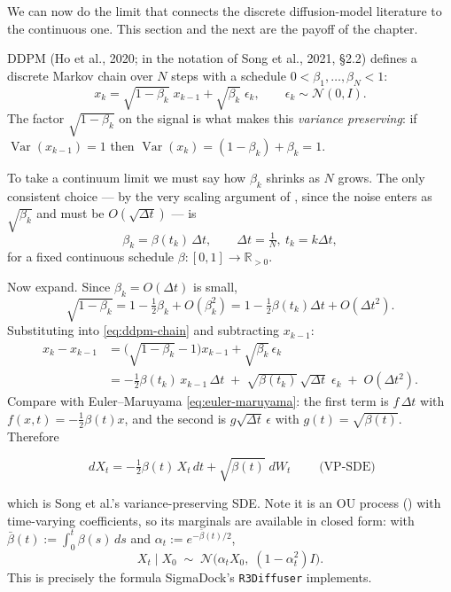 \documentclass[11pt,a4paper]{report}
\theoremstyle{definition}
\theoremstyle{remark}
\DeclareMathOperator{\Var}{Var}
\newcommand{\RR}{\mathbb R}
\newcommand{\pyfunc}[1]{\texttt{#1}}
\begin{document}
We can now do the limit that connects the discrete diffusion-model
literature to the continuous one. This section and the next are the payoff
of the chapter.

DDPM (Ho et al., 2020; in the notation of Song et al., 2021, §2.2) defines a
discrete Markov chain over $N$ steps with a schedule
$0<\beta_1,\dots,\beta_N<1$:
\begin{equation}
\label{eq:ddpm-chain}
x_k = \sqrt{1-\beta_k}\;x_{k-1} + \sqrt{\beta_k}\;\epsilon_k,
\qquad \epsilon_k\sim\mathcal N(0,I).
\end{equation}
The factor $\sqrt{1-\beta_k}$ on the signal is what makes this
\emph{variance preserving}: if $\Var(x_{k-1})=1$ then
$\Var(x_k)=(1-\beta_k)+\beta_k=1$.

To take a continuum limit we must say how $\beta_k$ shrinks as $N$ grows.
The only consistent choice --- by the very scaling argument of
, since the noise enters as $\sqrt{\beta_k}$ and
must be $O(\sqrt{\Delta t})$ --- is
\begin{equation}
\label{eq:beta-scaling}
\beta_k = \beta(t_k)\,\Delta t,\qquad \Delta t = \tfrac1N,\ t_k=k\Delta t,
\end{equation}
for a fixed continuous schedule $\beta:[0,1]\to\RR_{>0}$.

Now expand. Since $\beta_k=O(\Delta t)$ is small,
\begin{equation}
\sqrt{1-\beta_k} = 1 - \tfrac12\beta_k + O(\beta_k^2)
= 1 - \tfrac12\beta(t_k)\Delta t + O(\Delta t^2).
\end{equation}
Substituting into \eqref{eq:ddpm-chain} and subtracting $x_{k-1}$:
\begin{align}
x_k - x_{k-1}
&= \bigl(\sqrt{1-\beta_k}-1\bigr)x_{k-1} + \sqrt{\beta_k}\,\epsilon_k \\
&= -\tfrac12\beta(t_k)\,x_{k-1}\,\Delta t
 \;+\; \sqrt{\beta(t_k)}\,\sqrt{\Delta t}\;\epsilon_k
 \;+\; O(\Delta t^2).
\end{align}
Compare with Euler--Maruyama \eqref{eq:euler-maruyama}: the first term is
$f\,\Delta t$ with $f(x,t)=-\tfrac12\beta(t)x$, and the second is
$g\sqrt{\Delta t}\,\epsilon$ with $g(t)=\sqrt{\beta(t)}$. Therefore

\begin{equation}
\label{eq:vp-sde}
\boxed{\;dX_t = -\tfrac12\beta(t)\,X_t\,dt + \sqrt{\beta(t)}\;dW_t\;}
\qquad\text{(VP-SDE)}
\end{equation}

which is Song et al.'s variance-preserving SDE. Note it is an OU process
() with time-varying coefficients, so its marginals are
available in closed form: with $\bar\beta(t):=\int_0^t\beta(s)\,ds$ and
$\alpha_t:=e^{-\bar\beta(t)/2}$,
\begin{equation}
\label{eq:vp-marginal}
X_t\mid X_0 \;\sim\; \mathcal N\bigl(\alpha_tX_0,\;(1-\alpha_t^2)I\bigr).
\end{equation}
This is precisely the formula SigmaDock's \pyfunc{R3Diffuser} implements.
\end{document}
